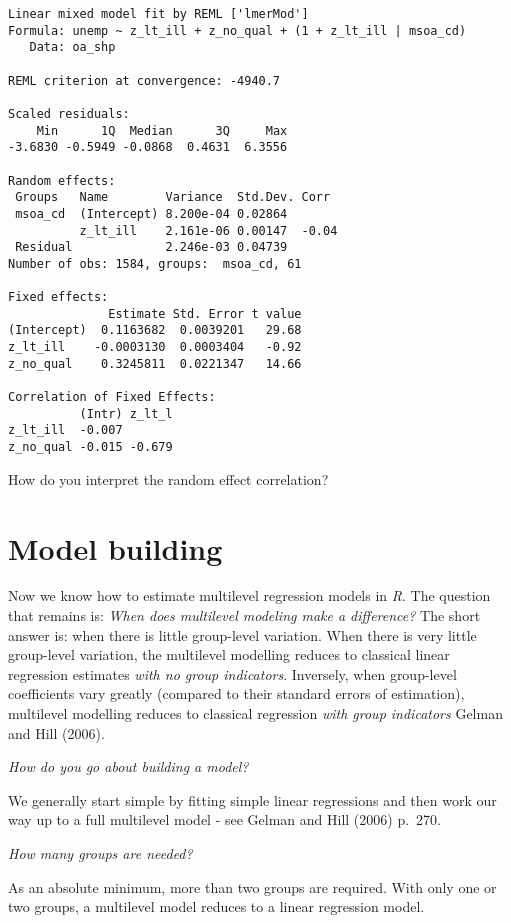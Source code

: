 \documentclass[
  letterpaper,
  krantz2]{style/krantz}
\begin{document}
\begin{verbatim}
Linear mixed model fit by REML ['lmerMod']
Formula: unemp ~ z_lt_ill + z_no_qual + (1 + z_lt_ill | msoa_cd)
   Data: oa_shp

REML criterion at convergence: -4940.7

Scaled residuals: 
    Min      1Q  Median      3Q     Max 
-3.6830 -0.5949 -0.0868  0.4631  6.3556 

Random effects:
 Groups   Name        Variance  Std.Dev. Corr 
 msoa_cd  (Intercept) 8.200e-04 0.02864       
          z_lt_ill    2.161e-06 0.00147  -0.04
 Residual             2.246e-03 0.04739       
Number of obs: 1584, groups:  msoa_cd, 61

Fixed effects:
              Estimate Std. Error t value
(Intercept)  0.1163682  0.0039201   29.68
z_lt_ill    -0.0003130  0.0003404   -0.92
z_no_qual    0.3245811  0.0221347   14.66

Correlation of Fixed Effects:
          (Intr) z_lt_l
z_lt_ill  -0.007       
z_no_qual -0.015 -0.679
\end{verbatim}

How do you interpret the random effect correlation?

\hypertarget{model-building}{%
\section{Model building}\label{model-building}}

Now we know how to estimate multilevel regression models in \emph{R}.
The question that remains is: \emph{When does multilevel modeling make a
difference?} The short answer is: when there is little group-level
variation. When there is very little group-level variation, the
multilevel modelling reduces to classical linear regression estimates
\emph{with no group indicators}. Inversely, when group-level
coefficients vary greatly (compared to their standard errors of
estimation), multilevel modelling reduces to classical regression
\emph{with group indicators} Gelman and Hill (2006).

\emph{How do you go about building a model?}

We generally start simple by fitting simple linear regressions and then
work our way up to a full multilevel model - see Gelman and Hill (2006)
p.~270.

\emph{How many groups are needed?}

As an absolute minimum, more than two groups are required. With only one
or two groups, a multilevel model reduces to a linear regression model.
\end{document}
